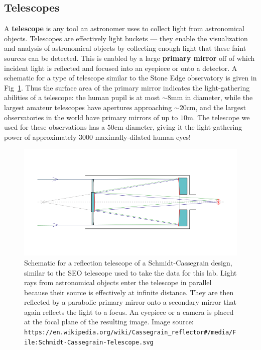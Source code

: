 \subsection{Telescopes}

A \textbf{telescope} is any tool an astronomer uses to collect light from astronomical objects. Telescopes are effectively light buckets --- they enable the visualization and analysis of astronomical objects by collecting enough light that these faint sources can be detected. This is enabled by a large \textbf{primary mirror} off of which incident light is reflected and focused into an eyepiece or onto a detector. A schematic for a type of telescope similar to the Stone Edge observatory is given in Fig~\ref{telescope_schematic}. Thus the surface area of the primary mirror indicates the light-gathering abilities of a telescope: the human pupil is at most $\sim8\textrm{mm}$ in diameter, while the largest amateur telescopes have apertures approaching $\sim20\textrm{cm}$, and the largest observatories in the world have primary mirrors of up to $10\textrm{m}$. The telescope we used for these observations has a $50\textrm{cm}$ diameter, giving it the light-gathering power of approximately 3000 maximally-dilated human eyes!

\begin{figure}
\label{telescope_schematic}
\includegraphics[scale = 0.5]{hr_diagram/Schmidt-Cassegrain-Telescope.png}
\caption{Schematic for a reflection telescope of a Schmidt-Cassegrain design, similar to the SEO telescope used to take the data for this lab.
Light rays from astronomical objects enter the telescope in parallel because their source is effectively at infinite distance. They are then reflected by a parabolic primary mirror onto a secondary mirror that again reflects the light to a focus. An eyepiece or a camera is placed at the focal plane of the resulting image. Image source: \texttt{https://en.wikipedia.org/wiki/Cassegrain\_reflector\#/media/File:Schmidt-Cassegrain-Telescope.svg}}
\end{figure}

